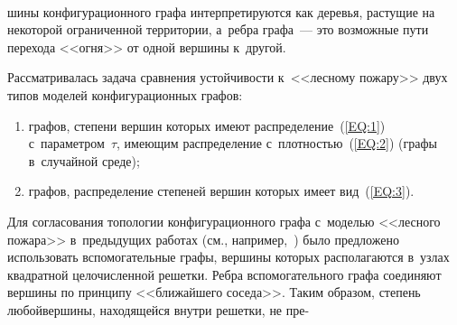 \begin{figure*} %
  \vspace*{1pt}
 \begin{center}
 \mbox{%
 \epsfxsize=123.097mm 
 }
 \end{center}
\vspace*{-9pt}
\end{figure*}

\begin{multicols}{2}


\noindent
шины конфигурационного графа интерпретируются как деревья,
растущие на некоторой ограниченной территории, а~реб\-ра графа~--- это воз\-мож\-ные пути перехода
<<огня>> от одной вершины к~другой. 

Рас\-смат\-ри\-ва\-лась задача сравнения устой\-чи\-вости 
к~<<лесному пожару>> двух типов моделей конфигурационных графов:\\[-15pt] 
\begin{enumerate}[(1)]
\item графов, степени вершин
которых имеют распределение~(\ref{EQ:1}) с~па\-ра\-мет\-ром~$\tau$, 
име\-ющим распределение 
с~плот\-ностью~(\ref{EQ:2})  (графы
в~случайной
 среде);
 \item графов, распределение
 степеней вершин
которых имеет вид~(\ref{EQ:3}).\\[-15pt] 
\end{enumerate}

Для согласования топологии конфигурационного графа 
с~моделью <<лес\-но\-го пожара>> в~предыду\-щих работах (см., например,~\cite{Ler1,Ler3,Ler2})
было пред\-ло\-же\-но использовать вспомогательные графы, %
верши\-ны которых располагаются 
в~узлах квад\-рат\-ной це\-ло\-чис\-лен\-ной решетки. 
Реб\-ра вспо\-мо\-га\-тель\-но\-го графа со\-еди\-ня\-ют вер\-ши\-ны по
прин\-ци\-пу <<бли\-жай\-ше\-го соседа>>. Таким образом, степень
 лю\-бой\linebreak вершины, на\-ходящейся внутри
решетки, не пре-\linebreak\vspace*{-12pt}

\pagebreak



\end{multicols}

